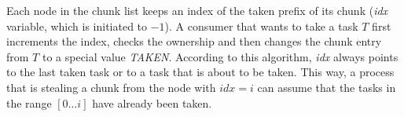 Each node in the chunk list keeps an index of the taken prefix of its chunk (\emph{idx} variable, which is initiated to $-1$). 
A consumer that wants to take a task $T$ first increments the index, checks the ownership and then changes the chunk entry from $T$ to a special value \emph{TAKEN}. According to this algorithm, \emph{idx} always points to the last taken task or to a task that is about to be taken. 
This way, a process that is stealing a chunk from the node with $\textit{idx} = i$ can assume that the tasks in the range $[0 \ldots i]$ have already been taken.



